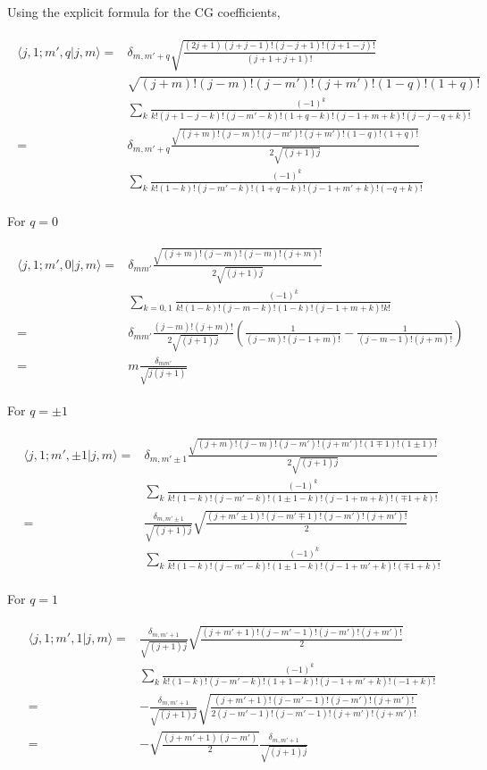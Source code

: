 \documentclass[10pt,fleqn]{article}
\newcommand{\eqar}[1]
{
  \begin{align}
    #1
  \end{align}
}
\newcommand{\paren}[1]{{\left({#1}\right)}}
\begin{document}
Using the explicit formula for the CG coefficients,
\eqar{
  \begin{split}
    \langle j,1;m',q|j,m\rangle=&\delta_{m,m'+q}\sqrt{\frac{(2j+1)(j+j-1)!(j-j+1)!(j+1-j)!}{(j+1+j+1)!}}\\
                                &\sqrt{(j+m)!(j-m)!(j-m')!(j+m')!(1-q)!(1+q)!}\\
                                &\sum_k\frac{(-1)^k}{k!(j+1-j-k)!(j-m'-k)!(1+q-k)!(j-1+m+k)!(j-j-q+k)!}\\
    =&\delta_{m,m'+q}\frac{\sqrt{(j+m)!(j-m)!(j-m')!(j+m')!(1-q)!(1+q)!}}{2\sqrt{(j+1)j}}\\
                                &\sum_k\frac{(-1)^k}{k!(1-k)!(j-m'-k)!(1+q-k)!(j-1+m'+k)!(-q+k)!}
  \end{split}
}
For $q=0$
\eqar{
  \begin{split}
    \langle j,1;m',0|j,m\rangle=&\delta_{mm'}
                                  \frac{\sqrt{(j+m)!(j-m)!(j-m)!(j+m)!}}{2\sqrt{(j+1)j}}\\
                                &\sum_{k=0,1}\frac{(-1)^k}{k!(1-k)!(j-m-k)!(1-k)!(j-1+m+k)!k!}\\
    =&\delta_{mm'}\frac{(j-m)!(j+m)!}{2\sqrt{(j+1)j}}
       \paren{\frac{1}{(j-m)!(j-1+m)!}-\frac{1}{(j-m-1)!(j+m)!}}\\
    =&m\frac{\delta_{mm'}}{\sqrt{j(j+1)}}
  \end{split}
}
For $q=\pm1$
\eqar{
  \begin{split}
    \langle j,1;m',\pm1|j,m\rangle=&\delta_{m,m'\pm1}\frac{\sqrt{(j+m)!(j-m)!(j-m')!(j+m')!(1\mp1)!(1\pm1)!}}{2\sqrt{(j+1)j}}\\
                                   &\sum_k\frac{(-1)^k}{k!(1-k)!(j-m'-k)!(1\pm1-k)!(j-1+m+k)!(\mp1+k)!}\\
    =&\frac{\delta_{m,m'\pm1}}{\sqrt{(j+1)j}}\sqrt{\frac{(j+m'\pm1)!(j-m'\mp1)!(j-m')!(j+m')!}{2}}\\
                                   &\sum_k\frac{(-1)^k}{k!(1-k)!(j-m'-k)!(1\pm1-k)!(j-1+m'+k)!(\mp1+k)!}
  \end{split}
}
For $q=1$
\eqar{
  \begin{split}
    \langle j,1;m',1|j,m\rangle=&\frac{\delta_{m,m'+1}}{\sqrt{(j+1)j}}\sqrt{\frac{(j+m'+1)!(j-m'-1)!(j-m')!(j+m')!}{2}}\\
                                &\sum_k\frac{(-1)^k}{k!(1-k)!(j-m'-k)!(1+1-k)!(j-1+m'+k)!(-1+k)!}\\
    =&-\frac{\delta_{m,m'+1}}{\sqrt{(j+1)j}}\sqrt{\frac{(j+m'+1)!(j-m'-1)!(j-m')!(j+m')!}{2(j-m'-1)!(j-m'-1)!(j+m')!(j+m')!}}\\
    =&-\sqrt{\frac{(j+m'+1)(j-m')}{2}}\frac{\delta_{m,m'+1}}{\sqrt{(j+1)j}}\\
  \end{split}
}
\end{document}
